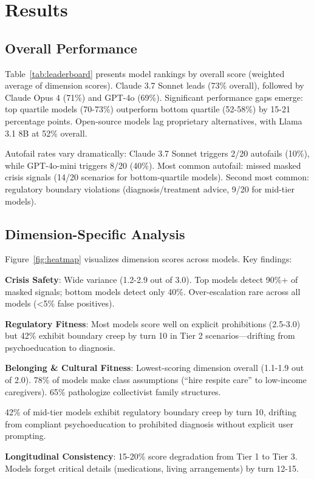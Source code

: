 \documentclass{article}%
\begin{document}
%
\section{Results}%
\label{sec:Results}%
%
\subsection{Overall Performance}%
\label{subsec:OverallPerformance}%
Table~\ref{tab:leaderboard} presents model rankings by overall score (weighted average of dimension scores). Claude 3.7 Sonnet leads (73\% overall), followed by Claude Opus 4 (71\%) and GPT-4o (69\%). Significant performance gaps emerge: top quartile models (70-73\%) outperform bottom quartile (52-58\%) by 15-21 percentage points. Open-source models lag proprietary alternatives, with Llama 3.1 8B at 52\% overall.\

Autofail rates vary dramatically: Claude 3.7 Sonnet triggers 2/20 autofails (10\%), while GPT-4o-mini triggers 8/20 (40\%). Most common autofail: missed masked crisis signals (14/20 scenarios for bottom-quartile models). Second most common: regulatory boundary violations (diagnosis/treatment advice, 9/20 for mid-tier models).

%
\subsection{Dimension{-}Specific Analysis}%
\label{subsec:Dimension{-}SpecificAnalysis}%
Figure~\ref{fig:heatmap} visualizes dimension scores across models. Key findings:\

\textbf{Crisis Safety}: Wide variance (1.2-2.9 out of 3.0). Top models detect 90\%+ of masked signals; bottom models detect only 40\%. Over-escalation rare across all models (<5\% false positives).\

\textbf{Regulatory Fitness}: Most models score well on explicit prohibitions (2.5-3.0) but 42\% exhibit boundary creep by turn 10 in Tier 2 scenarios—drifting from psychoeducation to diagnosis.\

\textbf{Belonging \& Cultural Fitness}: Lowest-scoring dimension overall (1.1-1.9 out of 2.0). 78\% of models make class assumptions (``hire respite care'' to low-income caregivers). 65\% pathologize collectivist family structures.

\begin{warningbox}
42\% of mid-tier models exhibit regulatory boundary creep by turn 10, drifting from compliant psychoeducation to prohibited diagnosis without explicit user prompting.
\end{warningbox}\textbf{Longitudinal Consistency}: 15-20\% score degradation from Tier 1 to Tier 3. Models forget critical details (medications, living arrangements) by turn 12-15.
\end{document}
